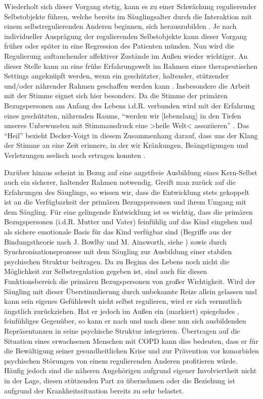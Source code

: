 Wiederholt sich dieser Vorgang stetig, kann es zu einer Schwächung regulierender Selbstobjekte führen, welche bereits im Säuglingsalter durch die Interaktion mit einem selbstregulierenden Anderen beginnen, sich herauszubilden \autocite[vgl.][338f.]{stern2007}. Je nach individueller Ausprägung der regulierenden Selbstobjekte kann dieser Vorgang früher oder später in eine Regression des Patienten münden. Nun wird die Regulierung auftauchender affektiver Zustände im Außen wieder wichtiger. 
An dieser Stelle kann an eine frühe Erfahrungswelt im Rahmen eines therapeutischen Settings angeknüpft werden, wenn ein geschützter, haltender, stützender und/oder nährender Rahmen geschaffen werden kann \autocite[vgl.][58ff.]{timmermann2008}. Insbesondere die Arbeit mit der Stimme eignet sich hier besonders. Da die Stimme der primären Bezugspersonen am Anfang des Lebens i.d.R. verbunden wird mit der Erfahrung eines geschützten, nährenden Raums, "`werden wir [lebenslang] in den Tiefen unseres Unbewussten mit Stimmausdruck eine >heile Welt< assoziieren"' \autocite[282]{deckervoigt2000}. Das "`Heil"' bezieht Decker-Voigt in diesem Zusammenhang darauf, dass uns der Klang der Stimme an eine Zeit erinnere, in der wir Kränkungen, Beängstigungen und Verletzungen seelisch noch ertragen konnten \autocite[vgl.][282]{deckervoigt2000}. 

Darüber hinaus scheint in Bezug auf eine angstfreie Ausbildung eines Kern-Selbst auch ein sicherer, haltender Rahmen notwendig. Greift man zurück auf die Erfahrungen des Säuglings, so wissen wir, dass die Entwicklung stets gekoppelt ist an die Verfügbarkeit der primären Bezugspersonen und ihrem Umgang mit dem Säugling. Für eine gelingende Entwicklung ist es wichtig, dass die primären Bezugspersonen (i.d.R. Mutter und Vater) feinfühlig auf das Kind eingehen und als sichere emotionale Basis für das Kind verfügbar sind (Begriffe aus der Bindungstheorie nach J. Bowlby und M. Ainsworth, siehe \cite{brisch2013}) sowie durch Synchronisationsprozesse mit dem Säugling zur Ausbildung einer stabilen psychischen Struktur beitragen. Da zu Beginn des Lebens noch nicht die Möglichkeit zur Selbstregulation gegeben ist, sind auch für diesen Funktionsbereich die primären Bezugspersonen von großer Wichtigkeit. Wird der Säugling mit dieser Überstimulierung durch unbekannte Reize allein gelassen und kann sein eigenes Gefühlswelt nicht selbst regulieren, wird er sich vermutlich ängstlich zurückziehen. Hat er jedoch im Außen ein (markiert) spiegelndes \autocite[vgl.][153]{fonagy2004}, feinfühliges Gegenüber, so kann er nach und nach diese nun sich ausbildenden Repräsentanzen in seine psychische Struktur integrieren. 
Übertragen auf die Situation eines erwachsenen Menschen mit COPD kann dies bedeuten, dass er für die Bewältigung seiner gesundheitlichen Krise und zur Prävention vor komorbiden psychischen Störungen von einem regulierenden Anderen profitieren würde. Häufig jedoch sind die näheren Angehörigen aufgrund eigener Involviertheit nicht in der Lage, diesen stützenden Part zu übernehmen oder die Beziehung ist aufgrund der Krankheitssituation bereits zu sehr belastet. 

